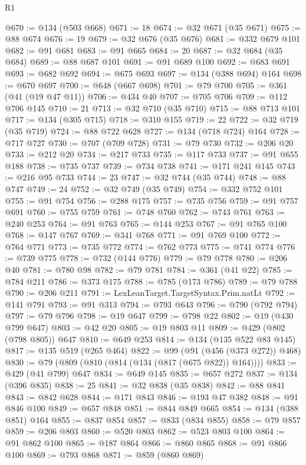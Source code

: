 \begin{lexlean}{R1}
\begin{coremodule}
{{{{{{{{{{{{{{{{{{{{{{{{{{{{{{{{{{{{{{{{{{{{{{{{{{{{{{{{{@670 := @134 (@503 @668)
@671 := 18
@674 := @32 @671 (@35 @671)
@675 := @88 @674
@676 := 19
@679 := @32 @676 (@35 @676)
@681 := @332 @679 @101
@682 := @91 @681
@683 := @91 @665
@684 := 20
@687 := @32 @684 (@35 @684)
@689 := @88 @687 @101
@691 := @91 @689 @100
@692 := @683 @691
@693 := @682 @692
@694 := @675 @693
@697 := @134 (@388 @694) @164
@698 := @670 @697
@700 := @648 (@667 @698)
@701 := @79 @700
@705 := @361 (@41 (@19 @47 @11))
@706 := @434 @40
@707 := @705 @706
@709 := @112 @706 @145
@710 := 21
@713 := @32 @710 (@35 @710)
@715 := @88 @713 @101
@717 := @134 (@305 @715)
@718 := @310 @155
@719 := 22
@722 := @32 @719 (@35 @719)
@724 := @88 @722 @628
@727 := @134 (@718 @724) @164
@728 := @717 @727
@730 := @707 (@709 @728)
@731 := @79 @730
@732 := @206 @20
@733 := @212 @20
@734 := @217 @733
@735 := @117 @733
@737 := @91 @655 @188
@738 := @735 @737
@739 := @734 @738
@741 := @171 @241 @145
@743 := @216 @95 @733
@744 := 23
@747 := @32 @744 (@35 @744)
@748 := @88 @747
@749 := 24
@752 := @32 @749 (@35 @749)
@754 := @332 @752 @101
@755 := @91 @754
@756 := @288 @175
@757 := @735 @756
@759 := @91 @757 @691
@760 := @755 @759
@761 := @748 @760
@762 := @743 @761
@763 := @240 @253
@764 := @91 @763
@765 := @144 @253
@767 := @91 @765 @100
@768 := @147 @767
@769 := @341 @768
@771 := @91 @769 @100
@772 := @764 @771
@773 := @735 @772
@774 := @762 @773
@775 := @741 @774
@776 := @739 @775
@778 := @732 (@144 @776)
@779 := @79 @778
@780 := @206 @40
@781 := @780 @98
@782 := @79 @781
@784 := @361 (@41 @22)
@785 := @784 @211
@786 := @373 @175
@788 := @785 (@173 @786)
@789 := @79 @788
@790 := @206 @211
@791 := LexLeanTarget.TargetSyntax.Prim.natLt
@792 := @141 @791
@793 := @91 @313
@794 := @793 @643
@796 := @790 (@792 @794)
@797 := @79 @796
@798 := @19 @647
@799 := @798 @22
@802 := @19 (@430 @799 @647)
@803 := @42 @20
@805 := @19 @803 @11
@809 := @429 (@802 (@798 @805)) @647
@810 := @649 @253
@814 := @134 (@135 @522 @83 @145)
@817 := @135 @519 (@265 @464)
@822 := @99 (@91 (@456 (@373 @272)) @468)
@830 := @79 (@809 (@810 (@814 (@134 (@817 (@675 @822)) @164))))
@833 := @429 (@41 @799) @647
@834 := @649 @145
@835 := @657 @272
@837 := @134 (@396 @835)
@838 := 25
@841 := @32 @838 (@35 @838)
@842 := @88 @841
@843 := @842 @628
@844 := @171 @843
@846 := @193 @47 @382
@848 := @91 @846 @100
@849 := @657 @848
@851 := @844 @849 @665
@854 := @134 (@388 @851) @164
@855 := @837 @854
@857 := @833 (@834 @855)
@858 := @79 @857
@859 := @206 @803
@860 := @520 @803
@862 := @523 @803 @100
@864 := @91 @862 @100
@865 := @187 @864
@866 := @860 @865
@868 := @91 @866 @100
@869 := @793 @868
@871 := @859 (@860 @869)
}}}}}}}}}}}}}}}}}}}}}}}}}}}}}}}}}}}}}}}}}}}}}}}}}}}}}}}}}
\end{coremodule}
\end{lexlean}
